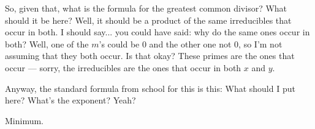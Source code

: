 \begin{speech}[01:23:55 - 01:24:46]
So, given that, what is the formula for the greatest common divisor? What should it be here?  Well, it should be a product of the same irreducibles that occur in both. I should say... you could have said: why do the same ones occur in both? Well, one of the $m$'s could be $0$ and the other one not $0$, so I'm not assuming that they both occur. Is that okay? These primes are the ones that occur --- sorry, the irreducibles are the ones that occur in both $x$ and $y$.

Anyway, the standard formula from school for this is this:  What should I put here? What's the exponent? Yeah?
\end{speech}

\begin{student}
Minimum.
\end{student}

